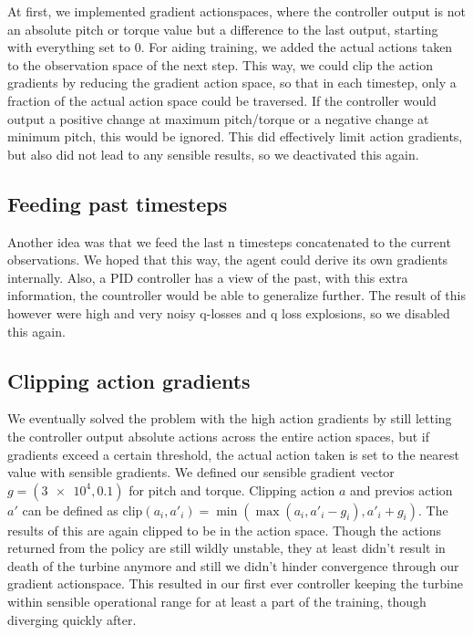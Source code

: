\documentclass[hyperref,beleg]{cgvpub}
\begin{document}
At first, we implemented gradient actionspaces, where the controller output is not an absolute pitch or torque value but a difference to the last output, starting with everything set to 0. For aiding training, we added the actual actions taken to the observation space of the next step. This way, we could clip the action gradients by reducing the gradient action space, so that in each timestep, only a fraction of the actual action space could be traversed. If the controller would output a positive change at maximum pitch/torque or a negative change at minimum pitch, this would be ignored. This did effectively limit action gradients, but also did not lead to any sensible results, so we deactivated this again.

\subsection{Feeding past timesteps}
\label{sec:feedpast}

Another idea was that we feed the last n timesteps concatenated to the current observations. We hoped that this way, the agent could derive its own gradients internally. Also, a PID controller has a view of the past, with this extra information, the countroller would be able to generalize further. The result of this however were high and very noisy q-losses and q loss explosions, so we disabled this again.

\subsection{Clipping action gradients}
\label{sec:clip_act_grad}
We eventually solved the problem with the high action gradients by still letting the controller output absolute actions across the entire action spaces, but if gradients exceed a certain threshold, the actual action taken is set to the nearest value with sensible gradients. We defined our sensible gradient vector $g = (\num{3e4}, 0.1)$ for pitch and torque. Clipping action $a$ and previos action $a'$ can be defined as $\mathrm{clip}(a_i, a'_i) = \min(\max(a_i, a'_i -g_i), a'_i + g_i)$. The results of this are again clipped to be in the action space. Though the actions returned from the policy are still wildly unstable, they at least didn't result in death of the turbine anymore and still we didn't hinder convergence through our gradient actionspace. This resulted in our first ever controller keeping the turbine within sensible operational range for at least a part of the training, though diverging quickly after.
\end{document}
